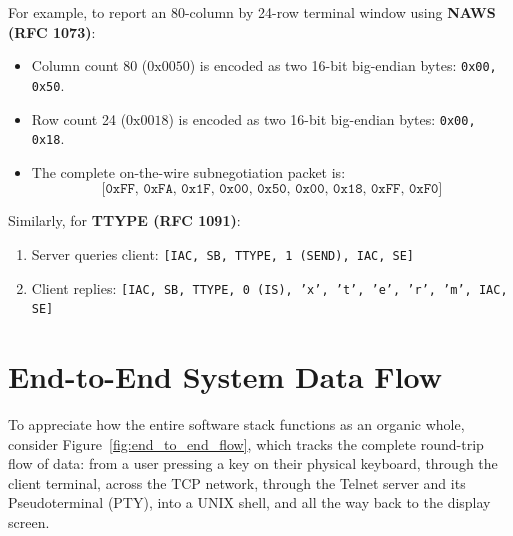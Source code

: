 For example, to report an 80-column by 24-row terminal window using \textbf{NAWS (RFC 1073)}:
\begin{itemize}[leftmargin=1.5em]
    \item Column count 80 ($0\text{x}0050$) is encoded as two 16-bit big-endian bytes: \texttt{0x00, 0x50}.
    \item Row count 24 ($0\text{x}0018$) is encoded as two 16-bit big-endian bytes: \texttt{0x00, 0x18}.
    \item The complete on-the-wire subnegotiation packet is:
    \[
    \texttt{[0xFF, 0xFA, 0x1F, 0x00, 0x50, 0x00, 0x18, 0xFF, 0xF0]}
    \]
\end{itemize}

Similarly, for \textbf{TTYPE (RFC 1091)}:
\begin{enumerate}[leftmargin=2em]
    \item Server queries client: \texttt{[IAC, SB, TTYPE, 1 (SEND), IAC, SE]}
    \item Client replies: \texttt{[IAC, SB, TTYPE, 0 (IS), 'x', 't', 'e', 'r', 'm', IAC, SE]}
\end{enumerate}

\section{End-to-End System Data Flow}

To appreciate how the entire software stack functions as an organic whole, consider Figure~\ref{fig:end_to_end_flow}, which tracks the complete round-trip flow of data: from a user pressing a key on their physical keyboard, through the client terminal, across the TCP network, through the Telnet server and its Pseudoterminal (PTY), into a UNIX shell, and all the way back to the display screen.

